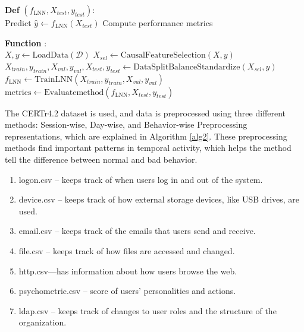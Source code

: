 \begin{algorithm}
\vspace{0.2cm}
\textbf{Def} $(f_{\text{LNN}}, X_{test}, y_{test})$:\ \\
\Indp Predict $\hat{y} \gets f_{\text{LNN}}(X_{test})$\;
Compute performance metrics \;
\Indm {}

\vspace{0.2cm}
\textbf{Function} :\ \\
\Indp $X, y \gets \text{LoadData}(\mathcal{D})$\;
$X_{sel} \gets \text{CausalFeatureSelection}(X, y)$\;
$X_{train}, y_{train}, X_{val}, y_{val}, X_{test}, y_{test} \gets \text{DataSplitBalanceStandardize}(X_{sel}, y)$\;
$f_{\text{LNN}} \gets \text{TrainLNN}(X_{train}, y_{train}, X_{val}, y_{val})$\;
$\text{metrics} \gets \text{Evaluatemethod}(f_{\text{LNN}}, X_{test}, y_{test})$\;
\Indm {}
\end{algorithm}
 The CERTr4.2 dataset is used, and data is preprocessed using three different methods: Session-wise, Day-wise, and Behavior-wise Preprocessing representations, which are explained in Algorithm \ref{alg2}.  These preprocessing methods find important patterns in temporal activity, which helps the method tell the difference between normal and bad behavior.
 
\begin{enumerate}

\item  logon.csv – keeps track of when users log in and out of the system.
\item device.csv – keeps track of how external storage devices, like USB drives, are used.
\item email.csv – keeps track of the emails that users send and receive.
\item file.csv – keeps track of how files are accessed and changed.
\item http.csv—has information about how users browse the web.
\item psychometric.csv – score of users' personalities and actions.
\item ldap.csv – keeps track of changes to user roles and the structure of the organization.
\end{enumerate}





